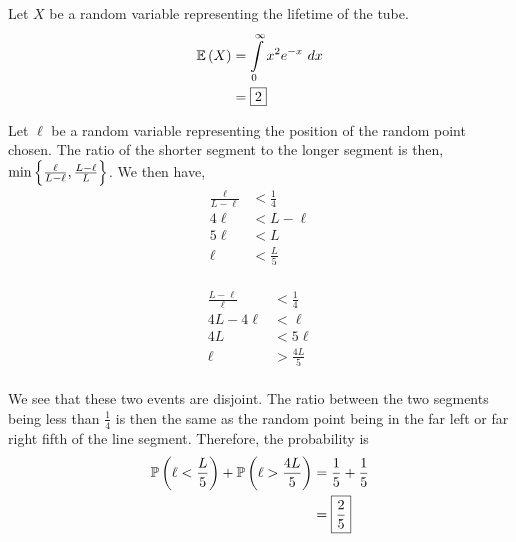 \documentclass{article}
\begin{document}
\setcounter{problem}{7}

\problem{}

Let $X$ be a random variable representing the lifetime of the tube.
\begin{align*}
  \mathbb{E} \left ( X \right) &= \int \limits_{0}^{\infty} x^2 e^{-x}\ dx \\
         &= \boxed{2} \\
\end{align*}


\setcounter{problem}{9}

\problem{}
Let $\ell$ be a random variable representing the position of the random point chosen.
The ratio of the shorter segment to the longer segment is then,
$\min \left \{ \frac{\ell}{L-\ell}, \frac{L - \ell}{L}  \right \}$.
We then have,
\begin{align*}
  \frac{\ell}{L - \ell} &< \frac{1}{4} \\
  4 \ell &< L - \ell \\
  5 \ell &< L \\
  \ell &< \frac{L}{5} \\
\end{align*}

\begin{align*}
  \frac{L - \ell}{\ell} &< \frac{1}{4} \\
  4 L - 4 \ell &< \ell \\
  4 L &< 5 \ell \\
  \ell &> \frac{4L}{5} \\
\end{align*}

We see that these two events are disjoint.
The ratio between the two segments being less than $\frac{1}{4}$ is then the same as the random point being in the far left or far right fifth of the line segment.
Therefore, the probability is
\begin{align*}
  \mathbb{P} \left ( \ell < \frac{L}{5} \right) + \mathbb{P} \left ( \ell > \frac{4L}{5} \right) &= \frac{1}{5} + \frac{1}{5} \\
                                                     &= \boxed{\frac{2}{5}} \\
\end{align*}
\end{document}
